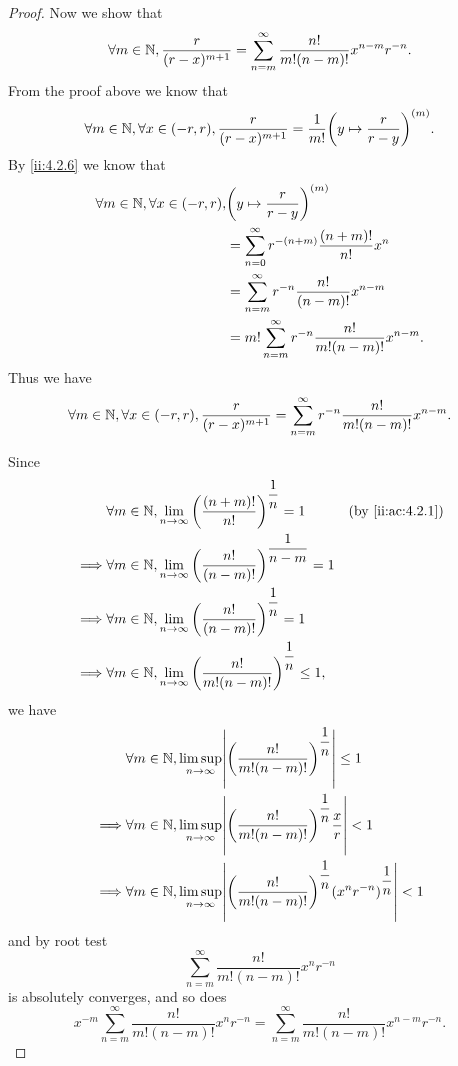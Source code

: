 \begin{proof}
  Now we show that
  \[
    \forall m \in \mathbb{N}, \dfrac{r}{(r - x)^{m + 1}} = \sum_{n = m}^\infty \dfrac{n!}{m! (n - m)!} x^{n - m} r^{-n}.
  \]
  From the proof above we know that
  \[
    \forall m \in \mathbb{N}, \forall x \in (-r, r), \dfrac{r}{(r - x)^{m + 1}} = \dfrac{1}{m!} \bigg(y \mapsto \dfrac{r}{r - y}\bigg)^{(m)}.
  \]
  By \cref{ii:4.2.6} we know that
  \begin{align*}
    \forall m \in \mathbb{N}, \forall x \in (-r, r), & \bigg(y \mapsto \dfrac{r}{r - y}\bigg)^{(m)}                       \\
                                             & = \sum_{n = 0}^\infty r^{-(n + m)} \dfrac{(n + m)!}{n!} x^n        \\
                                             & = \sum_{n = m}^\infty r^{-n} \dfrac{n!}{(n - m)!} x^{n - m}        \\
                                             & = m! \sum_{n = m}^\infty r^{-n} \dfrac{n!}{m! (n - m)!} x^{n - m}.
  \end{align*}
  Thus we have
  \[
    \forall m \in \mathbb{N}, \forall x \in (-r, r), \dfrac{r}{(r - x)^{m + 1}} = \sum_{n = m}^\infty r^{-n} \dfrac{n!}{m! (n - m)!} x^{n - m}.
  \]

  Since
  \begin{align*}
             & \forall m \in \N, \lim_{n \to \infty} \bigg(\dfrac{(n + m)!}{n!}\bigg)^{\dfrac{1}{n}} = 1        &  & \by{ii:ac:4.2.1} \\
    \implies & \forall m \in \N, \lim_{n \to \infty} \bigg(\dfrac{n!}{(n - m)!}\bigg)^{\dfrac{1}{n - m}} = 1                          \\
    \implies & \forall m \in \N, \lim_{n \to \infty} \bigg(\dfrac{n!}{(n - m)!}\bigg)^{\dfrac{1}{n}} = 1                              \\
    \implies & \forall m \in \N, \lim_{n \to \infty} \bigg(\dfrac{n!}{m! (n - m)!}\bigg)^{\dfrac{1}{n}} \leq 1,
  \end{align*}
  we have
  \begin{align*}
             & \forall m \in \N, \limsup_{n \to \infty} \abs{\bigg(\dfrac{n!}{m! (n - m)!}\bigg)^{\dfrac{1}{n}}} \leq 1                          \\
    \implies & \forall m \in \N, \limsup_{n \to \infty} \abs{\bigg(\dfrac{n!}{m! (n - m)!}\bigg)^{\dfrac{1}{n}} \dfrac{x}{r}} < 1                \\
    \implies & \forall m \in \N, \limsup_{n \to \infty} \abs{\bigg(\dfrac{n!}{m! (n - m)!}\bigg)^{\dfrac{1}{n}} (x^n r^{-n})^{\dfrac{1}{n}}} < 1
  \end{align*}
  and by root test
  \[
    \sum_{n = m}^\infty \dfrac{n!}{m! (n - m)!} x^n r^{-n}
  \]
  is absolutely converges, and so does
  \[
    x^{-m} \sum_{n = m}^\infty \dfrac{n!}{m! (n - m)!} x^n r^{-n} = \sum_{n = m}^\infty \dfrac{n!}{m! (n - m)!} x^{n - m} r^{-n}.
  \]
\end{proof}

